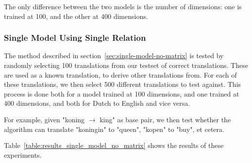 The only difference between the two models is the number of dimensions: one is trained at 100, and the other at 400 dimensions.

\subsubsection{Single Model Using Single Relation}
The method described in section~\ref{sec:single-model-no-matrix} is tested by randomly selecting 100 translations from our testset of correct translations. These are used as a known translation, to derive other translations from. For each of these translations, we then select 500 different translations to test against. This process is done both for a model trained at 100 dimensions, and one trained at 400 dimensions, and both for Dutch to English and vice versa.

For example, given "koning $\to$ king" as base pair, we then test whether the algorithm can translate "koningin" to "queen", "kopen" to "buy", et cetera.

Table~\ref{table:results_single_model_no_matrix} shows the results of these experiments.


